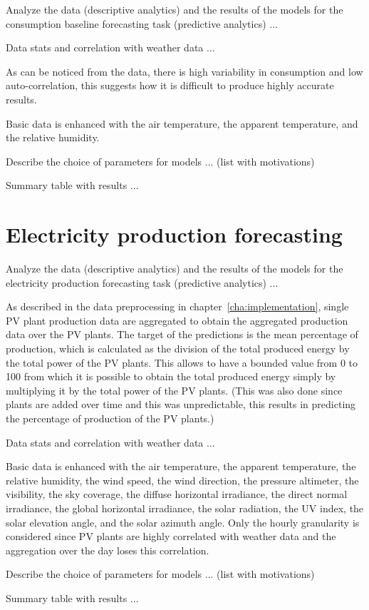 Analyze the data (descriptive analytics) and the results of the models for the consumption baseline forecasting task (predictive analytics) ...

Data stats and correlation with weather data ...

As can be noticed from the data, there is high variability in consumption and low auto-correlation, this suggests how it is difficult to produce highly accurate results.

Basic data is enhanced with the air temperature, the apparent temperature, and the relative humidity.

Describe the choice of parameters for models ... (list with motivations)

Summary table with results ...


\section{Electricity production forecasting}
\label{sec:productionval}
\vspace{0.2 cm}

Analyze the data (descriptive analytics) and the results of the models for the electricity production forecasting task (predictive analytics) ...

As described in the data preprocessing in chapter~\ref{cha:implementation}, single PV plant production data are aggregated to obtain the aggregated production data over the PV plants.
The target of the predictions is the mean percentage of production, which is calculated as the division of the total produced energy by the total power of the PV plants.
This allows to have a bounded value from 0 to 100 from which it is possible to obtain the total produced energy simply by multiplying it by the total power of the PV plants.
(This was also done since plants are added over time and this was unpredictable, this results in predicting the percentage of production of the PV plants.)

Data stats and correlation with weather data ...

Basic data is enhanced with the air temperature, the apparent temperature, the relative humidity, the wind speed, the wind direction, the pressure altimeter, the visibility, the sky coverage, the diffuse horizontal irradiance, the direct normal irradiance, the global horizontal irradiance, the solar radiation, the UV index, the solar elevation angle, and the solar azimuth angle.
Only the hourly granularity is considered since PV plants are highly correlated with weather data and the aggregation over the day loses this correlation.

Describe the choice of parameters for models ... (list with motivations)

Summary table with results ...
